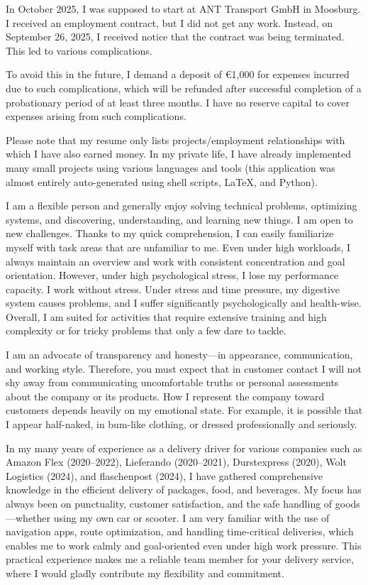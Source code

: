 		In October 2025, I was supposed to start at ANT Transport GmbH in Moosburg.  
		I received an employment contract, but I did not get any work.  
		Instead, on September 26, 2025, I received notice that the contract was being terminated.  
		This led to various complications.

		To avoid this in the future, I demand a deposit of €1,000 for expenses incurred due to such complications, which will be refunded after successful completion of a probationary period of at least three months.  
		I have no reserve capital to cover expenses arising from such complications.

		Please note that my resume only lists projects/employment relationships with which I have also earned money.  
		In my private life, I have already implemented many small projects using various languages and tools (this application was almost entirely auto-generated using shell scripts, LaTeX, and Python).

		I am a flexible person and generally enjoy solving technical problems, optimizing systems, and discovering, understanding, and learning new things.  
		I am open to new challenges.  
		Thanks to my quick comprehension, I can easily familiarize myself with task areas that are unfamiliar to me.  
		Even under high workloads, I always maintain an overview and work with consistent concentration and goal orientation.  
		However, under high psychological stress, I lose my performance capacity.  
		I work without stress.  
		Under stress and time pressure, my digestive system causes problems, and I suffer significantly psychologically and health-wise.  
		Overall, I am suited for activities that require extensive training and high complexity or for tricky problems that only a few dare to tackle.

		I am an advocate of transparency and honesty—in appearance, communication, and working style.
		Therefore, you must expect that in customer contact I will not shy away from communicating uncomfortable truths or personal assessments about the company or its products.
		How I represent the company toward customers depends heavily on my emotional state.
		For example, it is possible that I appear half-naked, in bum-like clothing, or dressed professionally and seriously.

		In my many years of experience as a delivery driver for various companies such as Amazon Flex (2020–2022), Lieferando (2020–2021), Durstexpress (2020), Wolt Logistics (2024), and flaschenpost (2024), I have gathered comprehensive knowledge in the efficient delivery of packages, food, and beverages.  
		My focus has always been on punctuality, customer satisfaction, and the safe handling of goods—whether using my own car or scooter.  
		I am very familiar with the use of navigation apps, route optimization, and handling time-critical deliveries, which enables me to work calmly and goal-oriented even under high work pressure.  
		This practical experience makes me a reliable team member for your delivery service, where I would gladly contribute my flexibility and commitment.


